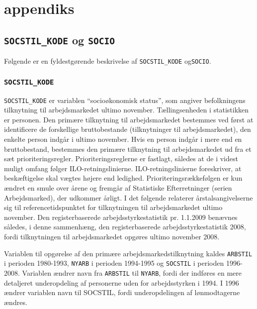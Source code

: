 
\chapter{appendiks} \label{appendiks}


\section{\texttt{SOCSTIL\_KODE} og {\texttt{SOCIO}  \label{appendiks_SOCSTIL_SOCIO}}}

Følgende er en fyldestgørende beskrivelse af \texttt{SOCSTIL\_KODE} og\texttt{SOCIO}.


\subsection{\texttt{SOCSTIL\_KODE} \label{}}

\texttt{SOCSTIL\_KODE} er variablen “socioøkonomisk status”, som angiver befolkningens tilknytning til arbejdsmarkedet ultimo november. Tællingsenheden i statistikken er personen. Den primære tilknytning til arbejdsmarkedet bestemmes ved først at identificere de forskellige bruttobestande (tilknytninger til arbejdsmarkedet), den enkelte person indgår i ultimo november. Hvis en person indgår i mere end en bruttobestand, bestemmes den primære tilknytning til arbejdsmarkedet ud fra et sæt prioriteringsregler. Prioriteringsreglerne er fastlagt, således at de i videst muligt omfang følger ILO-retningslinierne. ILO-retningslinierne foreskriver, at beskæftigelse skal vægtes højere end ledighed. Prioriteringsrækkefølgen er kun ændret en smule over årene og fremgår af Statistiske Efterretninger (serien Arbejdsmarked), der udkommer årligt. I det følgende relaterer årstalsangivelserne sig til referencetidspunktet for tilknytningen til arbejdsmarkedet ultimo november. Den registerbaserede arbejdsstyrkestatistik pr. 1.1.2009 benævnes således, i denne sammenhæng, den registerbaserede arbejdsstyrkestatistik 2008, fordi tilknytningen til arbejdsmarkedet opgøres ultimo november 2008.

Variablen til opgørelse af den primære arbejdsmarkedstilknytning kaldes \texttt{ARBSTIL} i perioden 1980-1993, \texttt{NYARB} i perioden 1994-1995 og \texttt{SOCSTIL} i perioden 1996-2008. Variablen ændrer navn fra \texttt{ARBSTIL} til \texttt{NYARB}, fordi der indføres en mere detaljeret underopdeling af personerne uden for arbejdsstyrken i 1994. I 1996 ændrer variablen navn til SOCSTIL, fordi underopdelingen af lønmodtagerne ændres.

